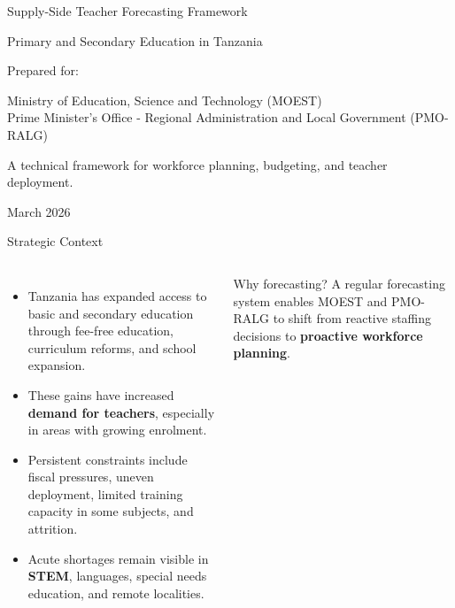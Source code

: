 \documentclass[
  11pt,
  ignorenonframetext,
  aspectratio=169,
  11pt]{beamer}
\author{}
\date{}
\newcommand{\highlight}[1]{\textcolor{DavidsonBlueDark}{\textbf{#1}}}
\newcommand{\gold}[1]{\textcolor{AccentGold}{\textbf{#1}}}
\begin{document}
\begin{frame}[plain]
  \vspace{0.9cm}
  {\color{white}Supply-Side Teacher Forecasting Framework\par}
  \vspace{0.2cm}
  {\color{white!92}Primary and Secondary Education in Tanzania\par}
  \vspace{0.7cm}
  {\color{white}\large Prepared for: \par}
  \vspace{0.15cm}
  {\color{white!92}\normalsize Ministry of Education, Science and Technology (MOEST)\\
  Prime Minister's Office - Regional Administration and Local Government (PMO-RALG)\par}
  \vfill
  {\color{white!85}\small A technical framework for workforce planning, budgeting, and teacher deployment.\par}
  \vspace{0.35cm}
  {\color{white!80}\small March 2026\par}
\end{frame}

\begin{frame}{Strategic Context}
\begin{columns}[T,onlytextwidth]
\begin{itemize}
  \item Tanzania has expanded access to basic and secondary education through fee-free education, curriculum reforms, and school expansion.
  \item These gains have increased \highlight{demand for teachers}, especially in areas with growing enrolment.
  \item Persistent constraints include fiscal pressures, uneven deployment, limited training capacity in some subjects, and attrition.
  \item Acute shortages remain visible in \gold{STEM}, languages, special needs education, and remote localities.
\end{itemize}
\begin{block}{Why forecasting?}
\justifying
A regular forecasting system enables MOEST and PMO-RALG to shift from reactive staffing decisions to \highlight{proactive workforce planning}.
\end{block}
\end{columns}
\end{frame}
\end{document}
